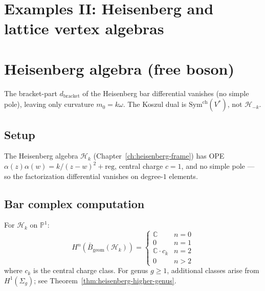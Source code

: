 \section{Examples II: Heisenberg and lattice vertex algebras}
 
\section{Heisenberg algebra (free boson)}
 
The bracket-part $d_{\mathrm{bracket}}$ of the Heisenberg bar differential vanishes (no simple pole), leaving only curvature $m_0 = k\omega$.  The Koszul dual is $\mathrm{Sym}^{\mathrm{ch}}(V^*)$, not $\mathcal{H}_{-k}$.

\subsection{Setup}
 
\begin{definition}
The Heisenberg algebra $\mathcal{H}_k$ (Chapter~\ref{ch:heisenberg-frame}) has OPE $\alpha(z)\alpha(w) = k/(z-w)^2 + \mathrm{reg}$, central charge $c=1$, and no simple pole --- so the factorization differential vanishes on degree-$1$ elements.
\end{definition}
 
\subsection{Bar complex computation}
\label{sec:heisenberg-bar-complex}
 
\begin{theorem}\label{thm:heisenberg-bar}
For $\mathcal{H}_k$ on $\mathbb{P}^1$:
\[
H^n(\bar{B}_{\text{geom}}(\mathcal{H}_k)) =
\begin{cases}
\mathbb{C} & n = 0 \\
0 & n = 1 \\
\mathbb{C} \cdot c_k & n = 2 \\
0 & n > 2
\end{cases}
\]
where $c_k$ is the central charge class.  For genus $g \geq 1$, additional classes arise from $H^1(\Sigma_g)$; see Theorem~\ref{thm:heisenberg-higher-genus}.
\end{theorem}
 
